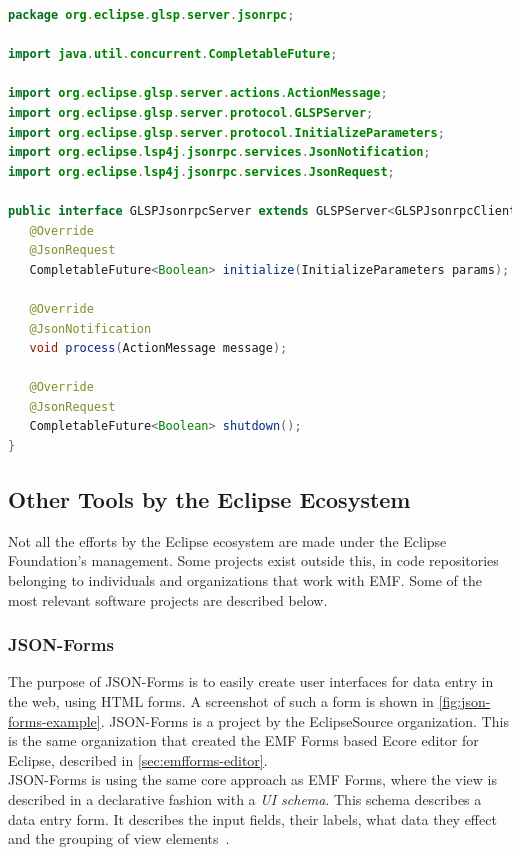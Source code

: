\begin{lstlisting}[language=java, label={lst:glsp-server}, caption={[GLSP Server Interface]GLSP Server java interface. Copied from \cite{philiplangerEclipseglspGlspserver2021}.}]
package org.eclipse.glsp.server.jsonrpc;

import java.util.concurrent.CompletableFuture;

import org.eclipse.glsp.server.actions.ActionMessage;
import org.eclipse.glsp.server.protocol.GLSPServer;
import org.eclipse.glsp.server.protocol.InitializeParameters;
import org.eclipse.lsp4j.jsonrpc.services.JsonNotification;
import org.eclipse.lsp4j.jsonrpc.services.JsonRequest;

public interface GLSPJsonrpcServer extends GLSPServer<GLSPJsonrpcClient> {
   @Override
   @JsonRequest
   CompletableFuture<Boolean> initialize(InitializeParameters params);

   @Override
   @JsonNotification
   void process(ActionMessage message);

   @Override
   @JsonRequest
   CompletableFuture<Boolean> shutdown();
}
\end{lstlisting}

\subsection{Other Tools by the Eclipse Ecosystem}
Not all the efforts by the Eclipse ecosystem are made under the Eclipse Foundation's management.
Some projects exist outside this, in code repositories belonging to individuals and organizations that work with \acrshort{EMF}.
Some of the most relevant software projects are described below.

\subsubsection{JSON-Forms}\label{sec:json-forms}

The purpose of JSON-Forms is to easily create user interfaces for data entry in the web, using HTML forms.
A screenshot of such a form is shown in \cref{fig:json-forms-example}.
JSON-Forms is a project by the EclipseSource organization.
This is the same organization that created the EMF Forms based \gls{Ecore} editor for \gls{Eclipse}, described in \cref{sec:emfforms-editor}.\\

JSON-Forms is using the same core approach as EMF Forms, where the view is described in a declarative fashion with a \textit{UI schema}.
This schema describes a data entry form.
It describes the input fields, their labels, what data they effect and the grouping of view elements~\cite{eclipsesourceWhatJSONForms}.\\

